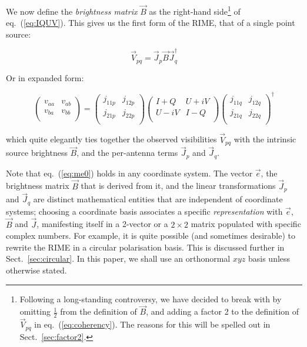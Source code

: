\documentclass[]{aa}
\begin{document}
We now define the {\em brightness matrix} $\vec B$ as the right-hand side\footnote{Following a long-standing controversy, we have decided to break with \citet{ME4} by omitting $\frac{1}{2}$ from the definition of $\vec B$, and adding a factor 2 to the definition of $\vec V_{pq}$ in eq.~(\ref{eq:coherency}). The reasons for this will be spelled out in Sect.~\ref{sec:factor2}.} of eq.~(\ref{eq:IQUV}). This gives us the first form of the RIME, that of a single point source:

    \begin{equation}\label{eq:me0}
    \vec V_{pq} = \vec J_p \vec B  \vec J^\dagger_q
    \end{equation}

Or in expanded form:

\[
    \left( 
    \begin{array}{cc}
    v_{aa} & v_{ab} \\
    v_{ba} & v_{bb} \\
    \end{array}
    \right) = 
    \left( 
    \begin{array}{cc}
    j_{11p} & j_{12p} \\
    j_{21p} & j_{22p} \\
    \end{array}
    \right) 
    \left( 
    \begin{array}{cc}
    I+Q & U+iV \\
    U-iV & I-Q \\
    \end{array}
    \right) 
    \left( 
    \begin{array}{cc}
    j_{11q} & j_{12q} \\
    j_{21q} & j_{22q} \\
    \end{array}
    \right)^\dagger
\]

which quite elegantly ties together the observed visibilities $\vec V_{pq}$ with the intrinsic source brightness $\vec B$, and the per-antenna terms $\vec J_p$ and $\vec J_q$.

Note that eq.~(\ref{eq:me0}) holds in any coordinate system. The vector $\vec e$, the brightness matrix $\vec B$ that is derived from it, and the linear transformations $\vec J_p$ and $\vec J_q$ are distinct mathematical entities that are independent of coordinate systems; choosing a coordinate basis associates a specific {\em representation} with $\vec e$,  $\vec B$ and $\vec J$, manifesting itself in a 2-vector or a $2\times2$ matrix populated with specific complex numbers. For example, it is quite possible (and sometimes desirable) to rewrite the RIME in a circular polarisation basis. This is discussed further in Sect.~\ref{sec:circular}. In this paper, we shall use an orthonormal $xyz$ basis unless otherwise stated.
\end{document}
